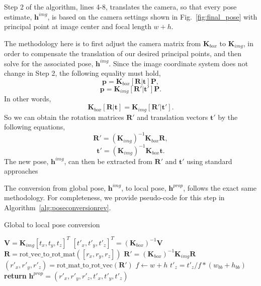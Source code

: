 \documentclass[final]{cvpr}
\begin{document}
Step 2 of the algorithm, lines 4-8, translates the camera, so that every pose estimate, $\mathbf{h}^{img}$, is based on the camera settings shown in Fig.~\ref{fig:final_pose} with principal point at image center and focal length $w+h$. 

The methodology here is to first adjust the camera matrix from $\mathbf{K}_{box}$ to $\mathbf{K}_{img}$, in order to compensate the translation of our desired principal points, and then solve for the associated pose, $\mathbf{h}^{img}$. Since the image coordinate system does not change in Step 2, the following equality must hold,
$$\mathbf{p} = \mathbf{K}_{box} [\mathbf{R} | \mathbf{t}] \mathbf{P},$$
$$\mathbf{p} = \mathbf{K}_{img} [\mathbf{R'} | \mathbf{t'}] \mathbf{P}.$$
In other words,
$$\mathbf{K}_{box} [\mathbf{R} | \mathbf{t}]
= \mathbf{K}_{img} [\mathbf{R'} | \mathbf{t'}].$$
So we can obtain the rotation matrices $\mathbf{R'}$ and translation vectors $\mathbf{t}'$ by the following equations,
$$\mathbf{R'} = (\mathbf{K}_{img})^{-1} \mathbf{K}_{box} \mathbf{R},$$
$$\mathbf{t'} = (\mathbf{K}_{img})^{-1} \mathbf{K}_{box} \mathbf{t}.$$
The new pose, $\mathbf{h}^{img}$, can then be extracted from $\mathbf{R'}$ and $\mathbf{t}'$ using standard approaches~\cite{rodrigues, hartley2003multiple}

The conversion from global pose, $\mathbf{h}^{img}$, to local pose, $\mathbf{h}^{prop}$, follows the exact same methodology. For completeness, we provide pseudo-code for this step in Algorithm~\ref{alg:poseconversionrev}.
\begin{algorithm}[h]
\caption{Global to local pose conversion}
\label{alg:poseconversionrev}
\begin{algorithmic}[1]
	    \State $\mathbf{V} = \mathbf{K}_{img} [t_x, t_y, t_z]^T$
	    \State $[t'_x, t'_y, t'_z]^T = (\mathbf{K}_{box})^{-1} \mathbf{V}$
	    \State $\mathbf{R} = \text{rot\_vec\_to\_rot\_mat}([r_x, r_y, r_z])$
	    \State $\mathbf{R'} = (\mathbf{K}_{box})^{-1} \mathbf{K}_{img} \mathbf{R} $
	    \State $(r'_x, r'_y, r'_z) = \text{rot\_mat\_to\_rot\_vec}(\mathbf{R'})$
	    \State $f \leftarrow w + h$
	    \State $t'_z = t'_z / f * (w_{bb} + h_{bb})$
	    \State \textbf{return} $\mathbf{h}^{prop} = (r'_x, r'_y, r'_z, t'_x, t'_y, t'_z)$  
	\EndProcedure
\end{algorithmic}
\end{algorithm}
\end{document}
